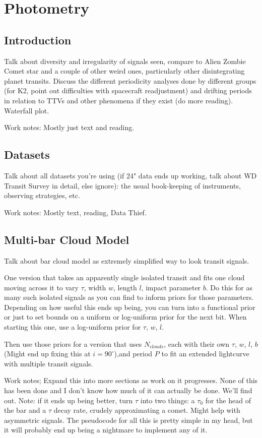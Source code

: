 \chapter{Photometry}
\label{chapter_photo}

\section{Introduction}
\label{photo_intro}
Talk about diversity and irregularity of signals seen, compare to Alien Zombie Comet star and a couple of other weird ones, particularly other disintegrating planet transits. Discuss the different periodicity analyses done by different groups (for K2, point out difficulties with spacecraft readjustment) and drifting periods in relation to TTVs and other phenomena if they exist (do more reading). Waterfall plot.


Work notes: Mostly just text and reading. 

\section{Datasets}
\label{photo_datasets}
Talk about all datasets you're using (if 24" data ends up working, talk about WD Transit Survey in detail, else ignore): the usual book-keeping of instruments, observing strategies, etc.

Work notes: Mostly text, reading, Data Thief. 



\section{Multi-bar Cloud Model}
\label{photo_barcloud}
Talk about bar cloud model as extremely simplified way to look transit signals.

One version that takes an apparently single isolated transit and fits one cloud moving across it to vary $\tau$, width $w$, length $l$, impact parameter $b$. Do this for as many such isolated signals as you can find to inform priors for those parameters. Depending on how useful this ends up being, you can turn into a functional prior or just to set bounds on a uniform or log-uniform prior for the next bit. When starting this one, use a log-uniform prior for $\tau$, $w$, $l$. 

Then use those priors for a version that uses $N_{clouds}$, each with their own $\tau$, $w$, $l$, $b$ (Might end up fixing this at $i = 90^{\circ}$),and period $P$ to fit an extended lightcurve with multiple transit signals.

Work notes; Expand this into more sections as work on it progresses. None of this has been done and I don't know how much of it can actually be done. We'll find out. Note: if it ends up being better, turn $\tau$ into two things: a $\tau_0$ for the head of the bar and a $\tau$ decay rate, crudely approximating a comet. Might help with asymmetric signals. The pseudocode for all this is pretty simple in my head, but it will probably end up being a nightmare to implement any of it. 


